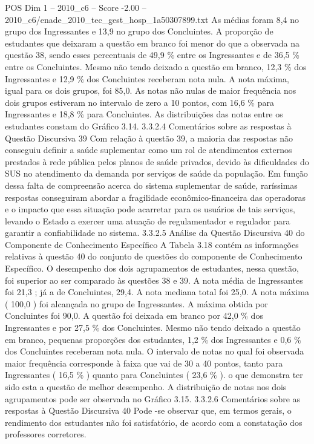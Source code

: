 \begin{textsample}{POS Dim 1 – 2010\_c6 – Score -2.00 – 2010\_c6/enade\_2010\_tec\_gest\_hosp\_1a50307899.txt}
As médias foram 8,4 no grupo dos Ingressantes e 13,9 no grupo dos Concluintes.
A proporção de estudantes que deixaram a questão em branco foi menor do que a observada na questão 38, sendo esses percentuais de 49,9 \% entre os Ingressantes e de 36,5 \% entre os Concluintes.
Mesmo não tendo deixado a questão em branco, 12,3 \% dos Ingressantes e 12,9 \% dos Concluintes receberam nota nula.
A nota máxima, igual para os dois grupos, foi 85,0.
As notas não nulas de maior frequência nos dois grupos estiveram no intervalo de zero a 10 pontos, com 16,6 \% para Ingressantes e 18,8 \% para Concluintes.
As distribuições das notas entre os estudantes constam do Gráfico 3.14. 3.3.2.4 Comentários sobre as respostas à Questão Discursiva 39 Com relação à questão 39, a maioria das respostas não conseguiu definir a saúde suplementar como um rol de atendimentos externos prestados à rede pública pelos planos de saúde privados, devido às dificuldades do SUS no atendimento da demanda por serviços de saúde da população.
Em função dessa falta de compreensão acerca do sistema suplementar de saúde, raríssimas respostas conseguiram abordar a fragilidade econômico-financeira das operadoras e o impacto que essa situação pode acarretar para os usuários de tais serviços, levando o Estado a exercer uma atuação de regulamentador e regulador para garantir a confiabilidade no sistema. 3.3.2.5 Análise da Questão Discursiva 40 do Componente de Conhecimento Específico A Tabela 3.18 contém as informações relativas à questão 40 do conjunto de questões do componente de Conhecimento Específico.
O desempenho dos dois agrupamentos de estudantes, nessa questão, foi superior ao ser comparado às questões 38 e 39.
A nota média de Ingressantes foi 21,3 ; já a de Concluintes, 29,4.
A nota mediana total foi 25,0.
A nota máxima ( 100,0 ) foi alcançada no grupo de Ingressantes.
A máxima obtida por Concluintes foi 90,0.
A questão foi deixada em branco por 42,0 \% dos Ingressantes e por 27,5 \% dos Concluintes.
Mesmo não tendo deixado a questão em branco, pequenas proporções dos estudantes, 1,2 \% dos Ingressantes e 0,6 \% dos Concluintes receberam nota nula.
O intervalo de notas no qual foi observada maior frequência corresponde à faixa que vai de 30 a 40 pontos, tanto para Ingressantes ( 16,5 \% ) quanto para Concluintes ( 23,6 \% ). o que demonstra ter sido esta a questão de melhor desempenho.
A distribuição de notas nos dois agrupamentos pode ser observada no Gráfico 3.15. 3.3.2.6 Comentários sobre as respostas à Questão Discursiva 40 Pode -se observar que, em termos gerais, o rendimento dos estudantes não foi satisfatório, de acordo com a constatação dos professores corretores.

\end{textsample}
